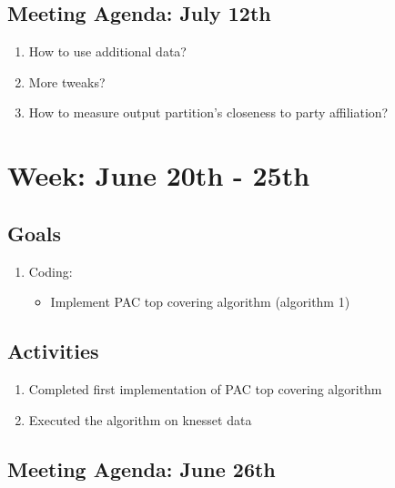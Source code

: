 \documentclass[a4paper]{article}
\begin{document}
\subsection*{Meeting Agenda: July 12th}

\begin{enumerate}
  \item How to use additional data?
  \item More tweaks?
  \item How to measure output partition's closeness to party affiliation?
\end{enumerate}

\section*{Week: June 20th - 25th}

\subsection*{Goals}

\begin{enumerate}
  \item Coding:
  \begin{itemize}
    \item Implement PAC top covering algorithm (algorithm 1)
  \end{itemize}
\end{enumerate}

\subsection*{Activities}

\begin{enumerate}
  \item Completed first implementation of PAC top covering algorithm
  \item Executed the algorithm on knesset data
\end{enumerate}

\subsection*{Meeting Agenda: June 26th}
\end{document}
